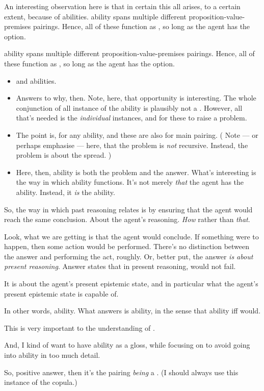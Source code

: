 \begin{note}
  An interesting observation here is that in certain this all arises, to a certain extent, because of \abgen{} abilities.
   ability spans multiple different proposition-value-premises pairings.
  Hence, all of these function as , so long as the agent has the option.

   ability spans multiple different proposition-value-premises pairings.
  Hence, all of these function as , so long as the agent has the option.

  \begin{itemize}
  \item
     and \abspec{} abilities.
  \item
    Answers to why, then.
    Note, here, that opportunity is interesting.
    The whole conjunction of all instance of the \abgen{} ability is plausibly not a \requ{}.
    However, all that's needed is the \emph{individual} instances, and for these to raise a problem.
  \item
    The point is,  for any \abgen{} ability, and these are also  for main pairing.
    (%
    Note --- or perhaps emphasise --- here, that the problem is \emph{not} recursive.
    Instead, the problem is about the spread.%
    )
  \item
    Here, then, ability is both the problem and the answer.
    What's interesting is the way in which ability functions.
    It's not merely \emph{that} the agent has the ability.
    Instead, it \emph{is} the ability.
  \end{itemize}
\end{note}

\begin{note}
  So, the way in which past reasoning relates is by ensuring that the agent would reach the same conclusion.
  About the agent's reasoning.
  \emph{How} rather than \emph{that}.

  Look, what we are getting is that the agent would conclude.
  If something were to happen, then some action would be performed.
  There's no distinction between the answer and performing the act, roughly.
  Or, better put, the answer \emph{is about present reasoning}.
  Answer states that in present reasoning, would not fail.

  It is about the agent's present epistemic state, and in particular what the agent's present epistemic state is capable of.

  In other words, ability.
  What answers is ability, in the sense that ability iff would.

  This is very important to the understanding of \fc{}.

  And, I kind of want to have ability as a gloss, while focusing on \fc{} to avoid going into ability in too much detail.

  So, positive answer, then it's the pairing \emph{being} a \fc{}.
  (I should always use this instance of the copula.)
\end{note}

